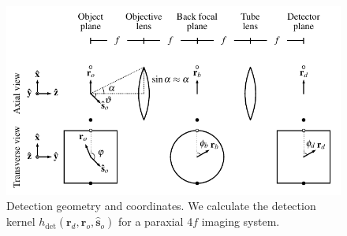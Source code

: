 \documentclass{osa-article}
\providecommand{\ro}{\mathbf{\mathbf{r}}_o}
\providecommand{\so}{\mathbf{\hat{s}}_o}
\providecommand{\rd}{\mathbf{r}_d}
\begin{document}
\begin{figure}[h]
 \centering
   \centering
   \includegraphics[scale=.9]{../figures/detection-coords/detection-coords.pdf}
   \caption{Detection geometry and coordinates. We calculate the detection
     kernel $h_{\text{det}}(\rd, \ro, \so)$ for a paraxial 4$f$ imaging
     system.}
   \label{fig:detection}
 \end{figure}
 
\end{document}
